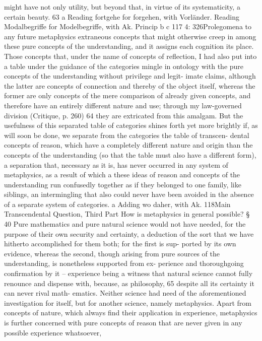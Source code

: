might have not only utility, but beyond that, in virtue of its systematicity, a
certain beauty. 63
a Reading fortgehe for forgehen, with Vorländer.
Reading Modalbegriffe for Modelbegriffe, with Ak.
Princip
b
c
117
4: 326Prolegomena to any future metaphysics
extraneous concepts that might otherwise creep in among these pure
concepts of the understanding, and it assigns each cognition its place.
Those concepts that, under the name of concepts of reﬂection, I had also
put into a table under the guidance of the categories mingle in ontology
with the pure concepts of the understanding without privilege and legit-
imate claims, although the latter are concepts of connection and thereby
of the object itself, whereas the former are only concepts of the mere
comparison of already given concepts, and therefore have an entirely
different nature and use; through my law-governed division (Critique,
p. 260) 64 they are extricated from this amalgam. But the usefulness of
this separated table of categories shines forth yet more brightly if, as
will soon be done, we separate from the categories the table of transcen-
dental concepts of reason, which have a completely different nature and
origin than the concepts of the understanding (so that the table must
also have a different form), a separation that, necessary as it is, has never
occurred in any system of metaphysics, as a result of which a these ideas
of reason and concepts of the understanding run confusedly together as
if they belonged to one family, like siblings, an intermingling that also
could never have been avoided in the absence of a separate system of
categories.
a
Adding wo daher, with Ak.
118Main Transcendental Question,
Third Part
How is metaphysics in general possible?
§ 40
Pure mathematics and pure natural science would not have needed, for
the purpose of their own security and certainty, a deduction of the sort
that we have hitherto accomplished for them both; for the ﬁrst is sup-
ported by its own evidence, whereas the second, though arising from
pure sources of the understanding, is nonetheless supported from ex-
perience and thoroughgoing conﬁrmation by it – experience being a
witness that natural science cannot fully renounce and dispense with,
because, as philosophy, 65 despite all its certainty it can never rival math-
ematics. Neither science had need of the aforementioned investigation
for itself, but for another science, namely metaphysics.
Apart from concepts of nature, which always ﬁnd their application
in experience, metaphysics is further concerned with pure concepts
of reason that are never given in any possible experience whatsoever,
